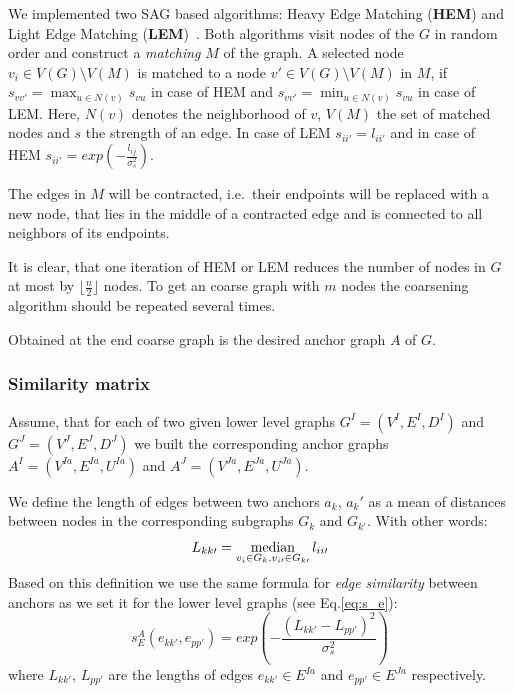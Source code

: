 We implemented two SAG based algorithms: Heavy Edge Matching (\textbf{HEM}) and Light Edge Matching (\textbf{LEM})~\cite{Chevalier09_GP}. Both algorithms visit nodes of the $G$ in random order and construct a \emph{matching} $M$ of the graph. A selected node $v_i\in V(G)\setminus V(M)$ is matched to a node $v\prime\in V(G)\setminus V(M)$ in $M$, if $s_{vv\prime} = \max_{u\in N(v)} s_{vu}$ in case of HEM and
$s_{vv\prime} = \min_{u\in N(v)} s_{vu}$ in case of LEM. Here, $N(v)$ denotes the neighborhood of $v$, $V(M)$ the set of matched nodes and $s$ the strength of an edge. In case of LEM $s_{ii\prime} = l_{ii\prime}$ and in case of HEM $s_{ii\prime} = exp(-\frac{l_{ij}}{\sigma^2_{s}})$.

The edges in $M$ will be contracted, i.e.\ their endpoints will be replaced with a new node, that lies in the middle of a contracted edge and is connected to all neighbors of its endpoints.

It is clear, that one iteration of HEM or LEM reduces the number of nodes in $G$ at most by $\lfloor\frac{n}{2} \rfloor$ nodes. To get an coarse graph with $m$ nodes the coarsening algorithm should be repeated several times.

Obtained at the end coarse graph is the desired anchor graph $A$ of $G$. 

\subsubsection{Similarity matrix}

Assume, that for each of two given lower level graphs $G^I = (V^I, E^I, D^I)$ and $G^J=(V^J, E^J, D^J)$ we built the corresponding anchor graphs  $A^I=(V^{Ia},E^{Ia}, U^{Ia})$ and $A^J=(V^{Ja},E^{Ja},U^{Ja})$. 

We define the length of edges between two anchors $a_k$, $a_k\prime$ as a mean of distances between nodes in the corresponding subgraphs $G_k$ and $G_{k\prime}$. With other words:
\begin{equation} L_{kk\prime} = \mathop{\rm median}_{v_i\in G_k, v_{i\prime}\in G_{k\prime}} l_{ii\prime} \end{equation}
Based on this definition we use the same formula for \emph{edge similarity} between anchors as we set it for the lower level graphs (see Eq.\ref{eq:s_e}):
\begin{equation} 
s^A_E(e_{kk\prime}, e_{pp\prime}) = exp(-\frac{(L_{kk\prime} - L_{pp\prime})^2}{\sigma^2_{s}})
\label{eq:s_e_A}
\end{equation}
where $L_{kk\prime}$, $L_{pp\prime} $ are the lengths of edges $e_{kk\prime}\in E^{Ia}$ and $e_{pp\prime}\in E^{Ja}$ respectively.

